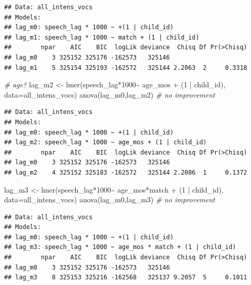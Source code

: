 \documentclass[
]{article}
\newenvironment{Shaded}{\begin{snugshade}}{\end{snugshade}}
\newcommand{\AttributeTok}[1]{\textcolor[rgb]{0.77,0.63,0.00}{#1}}
\newcommand{\CommentTok}[1]{\textcolor[rgb]{0.56,0.35,0.01}{\textit{#1}}}
\newcommand{\DecValTok}[1]{\textcolor[rgb]{0.00,0.00,0.81}{#1}}
\newcommand{\FunctionTok}[1]{\textcolor[rgb]{0.00,0.00,0.00}{#1}}
\newcommand{\NormalTok}[1]{#1}
\newcommand{\OtherTok}[1]{\textcolor[rgb]{0.56,0.35,0.01}{#1}}
\newcommand{\SpecialCharTok}[1]{\textcolor[rgb]{0.00,0.00,0.00}{#1}}
\begin{document}
\begin{verbatim}
## Data: all_intens_vocs
## Models:
## lag_m0: speech_lag * 1000 ~ +(1 | child_id)
## lag_m1: speech_lag * 1000 ~ match + (1 | child_id)
##        npar    AIC    BIC  logLik deviance  Chisq Df Pr(>Chisq)
## lag_m0    3 325152 325176 -162573   325146                     
## lag_m1    5 325154 325193 -162572   325144 2.2063  2     0.3318
\end{verbatim}

\begin{Shaded}
\begin{Highlighting}[]
\CommentTok{\# age?}
\NormalTok{lag\_m2 }\OtherTok{\textless{}{-}} \FunctionTok{lmer}\NormalTok{(speech\_lag}\SpecialCharTok{*}\DecValTok{1000}\SpecialCharTok{\textasciitilde{}}\NormalTok{ age\_mos }\SpecialCharTok{+}\NormalTok{ (}\DecValTok{1} \SpecialCharTok{|}\NormalTok{ child\_id), }\AttributeTok{data=}\NormalTok{all\_intens\_vocs)}
\FunctionTok{anova}\NormalTok{(lag\_m0,lag\_m2) }\CommentTok{\# no improvement}
\end{Highlighting}
\end{Shaded}

\begin{verbatim}
## Data: all_intens_vocs
## Models:
## lag_m0: speech_lag * 1000 ~ +(1 | child_id)
## lag_m2: speech_lag * 1000 ~ age_mos + (1 | child_id)
##        npar    AIC    BIC  logLik deviance  Chisq Df Pr(>Chisq)
## lag_m0    3 325152 325176 -162573   325146                     
## lag_m2    4 325152 325183 -162572   325144 2.2086  1     0.1372
\end{verbatim}

\begin{Shaded}
\begin{Highlighting}[]
\NormalTok{lag\_m3 }\OtherTok{\textless{}{-}} \FunctionTok{lmer}\NormalTok{(speech\_lag}\SpecialCharTok{*}\DecValTok{1000}\SpecialCharTok{\textasciitilde{}}\NormalTok{ age\_mos}\SpecialCharTok{*}\NormalTok{match }\SpecialCharTok{+}\NormalTok{ (}\DecValTok{1} \SpecialCharTok{|}\NormalTok{ child\_id), }\AttributeTok{data=}\NormalTok{all\_intens\_vocs)}
\FunctionTok{anova}\NormalTok{(lag\_m0,lag\_m3) }\CommentTok{\# no improvement}
\end{Highlighting}
\end{Shaded}

\begin{verbatim}
## Data: all_intens_vocs
## Models:
## lag_m0: speech_lag * 1000 ~ +(1 | child_id)
## lag_m3: speech_lag * 1000 ~ age_mos * match + (1 | child_id)
##        npar    AIC    BIC  logLik deviance  Chisq Df Pr(>Chisq)
## lag_m0    3 325152 325176 -162573   325146                     
## lag_m3    8 325153 325216 -162568   325137 9.2057  5     0.1011
\end{verbatim}
\end{document}
